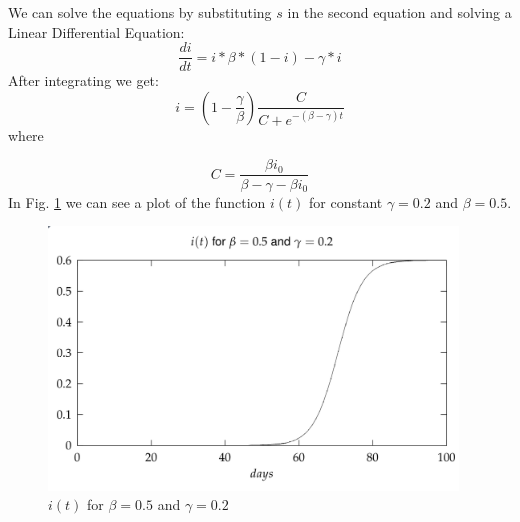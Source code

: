 We can solve the equations by substituting $s$ in the second equation and solving a Linear Differential Equation:
\begin{equation}
\frac{di}{dt} = i * \beta * (1 - i) - \gamma * i
\end{equation}
After integrating we get:
\begin{equation}
i = (1 - \frac{\gamma}{\beta}) \frac{C}{C + e^{-(\beta - \gamma)t}}
\end{equation}
where 

\begin{equation}
C = \frac{\beta i_0}{\beta-\gamma-\beta i_0}
\end{equation}
In Fig. \ref{fig:sis_it} we can see a plot of the function $i(t)$ for constant $\gamma = 0.2$ and $\beta = 0.5$.

\begin{figure}[h!]
    \centering
    \includegraphics[height=7cm]{img/sis_it.png}
    \caption{$i(t)$ for $\beta = 0.5$ and $\gamma=0.2$}
    \label{fig:sis_it}
\end{figure}


